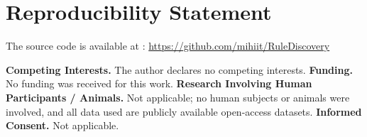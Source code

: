 \documentclass[conference]{IEEEtran}
\begin{document}
\section*{Reproducibility Statement}
The source code is available at : \url{https://github.com/mihiit/RuleDiscovery}

\textbf{Competing Interests.} The author declares no competing interests. \textbf{Funding.} No funding was received for this work. \textbf{Research Involving Human Participants / Animals.} Not applicable; no human subjects or animals were involved, and all data used are publicly available open-access datasets. \textbf{Informed Consent.} Not applicable.



\end{document}
